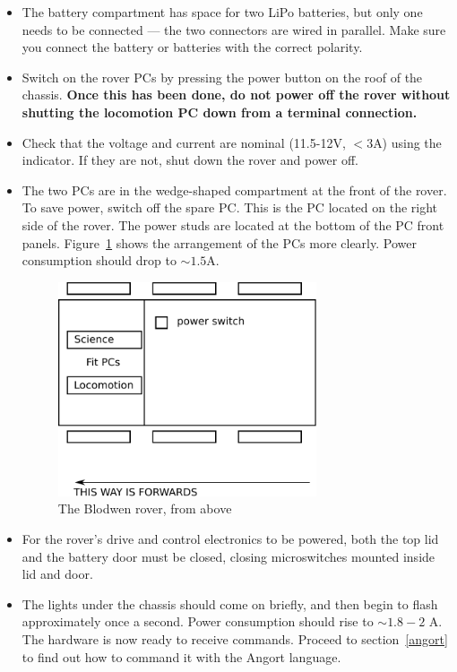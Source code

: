 \begin{itemize}
\item The battery compartment has space for two LiPo batteries, but only one needs
to be connected --- the two connectors are wired in parallel. Make sure you connect
the battery or batteries with the correct polarity.
\item Switch on the rover PCs by pressing the power button on the roof of the chassis.
\textbf{Once this has been done, do not power off the rover without shutting the locomotion PC down from
a terminal connection.}
\item Check that the voltage and current are nominal (11.5-12V, $<3$A) using the indicator. If they are
not, shut down the rover and power off.
\item The two PCs are in the wedge-shaped compartment at the front of the rover.
To save power, switch off the spare PC. This is the PC located on the right side of the rover.
The power studs are located at the bottom of the PC
front panels. Figure~\ref{fig:blod2} shows the arrangement of the PCs more clearly. Power consumption should drop
to $\sim 1.5$A.
\begin{figure}[ht]
\center
\includegraphics[width=3in]{blod2.pdf}
\caption{The Blodwen rover, from above}
\label{fig:blod2}
\end{figure}
\item For the rover's drive and control electronics to be powered, both the top lid
and the battery door must be closed, closing microswitches mounted inside lid and door.
\item The lights under the chassis should come on briefly, and then begin to flash approximately
once a second. Power consumption should rise to $\sim 1.8-2$ A. The hardware is now ready to receive commands. Proceed to
section~\ref{angort} to find out how to command it with the Angort language.
\end{itemize}

